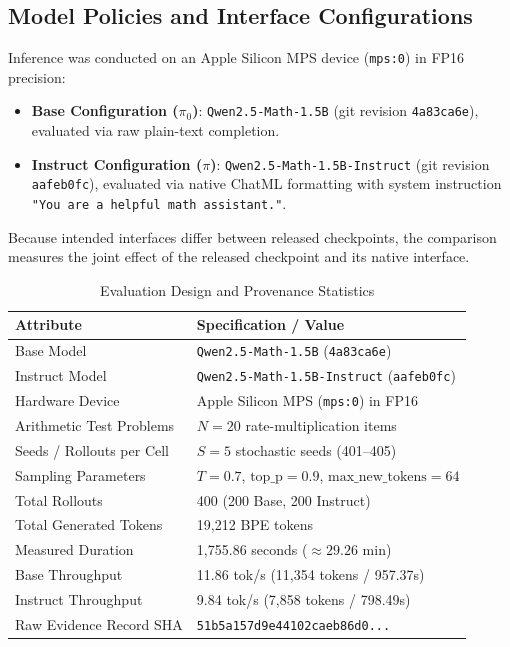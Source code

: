 \documentclass[conference]{IEEEtran}
\begin{document}
\subsection{Model Policies and Interface Configurations}
Inference was conducted on an Apple Silicon MPS device (\texttt{mps:0}) in FP16 precision:
\begin{itemize}
    \item \textbf{Base Configuration ($\pi_0$)}: \texttt{Qwen2.5-Math-1.5B} (git revision \texttt{4a83ca6e}), evaluated via raw plain-text completion.
    \item \textbf{Instruct Configuration ($\pi$)}: \texttt{Qwen2.5-Math-1.5B-Instruct} (git revision \texttt{aafeb0fc}), evaluated via native ChatML formatting with system instruction \texttt{"You are a helpful math assistant."}.
\end{itemize}
Because intended interfaces differ between released checkpoints, the comparison measures the joint effect of the released checkpoint and its native interface.

\begin{table}[htbp]
\caption{Evaluation Design and Provenance Statistics}
\label{tab:provenance}
\centering
\begin{tabularx}{\columnwidth}{Xl}
\toprule
\textbf{Attribute} & \textbf{Specification / Value} \\
\midrule
Base Model & \texttt{Qwen2.5-Math-1.5B} (\texttt{4a83ca6e}) \\
Instruct Model & \texttt{Qwen2.5-Math-1.5B-Instruct} (\texttt{aafeb0fc}) \\
Hardware Device & Apple Silicon MPS (\texttt{mps:0}) in FP16 \\
Arithmetic Test Problems & $N = 20$ rate-multiplication items \\
Seeds / Rollouts per Cell & $S = 5$ stochastic seeds (401--405) \\
Sampling Parameters & $T = 0.7$, $\text{top\_p} = 0.9$, $\text{max\_new\_tokens} = 64$ \\
Total Rollouts & 400 (200 Base, 200 Instruct) \\
Total Generated Tokens & 19,212 BPE tokens \\
Measured Duration & 1,755.86 seconds ($\approx 29.26$ min) \\
Base Throughput & 11.86 tok/s (11,354 tokens / 957.37s) \\
Instruct Throughput & 9.84 tok/s (7,858 tokens / 798.49s) \\
Raw Evidence Record SHA & \texttt{51b5a157d9e44102caeb86d0...} \\
\bottomrule
\end{tabularx}
\end{table}
\end{document}
